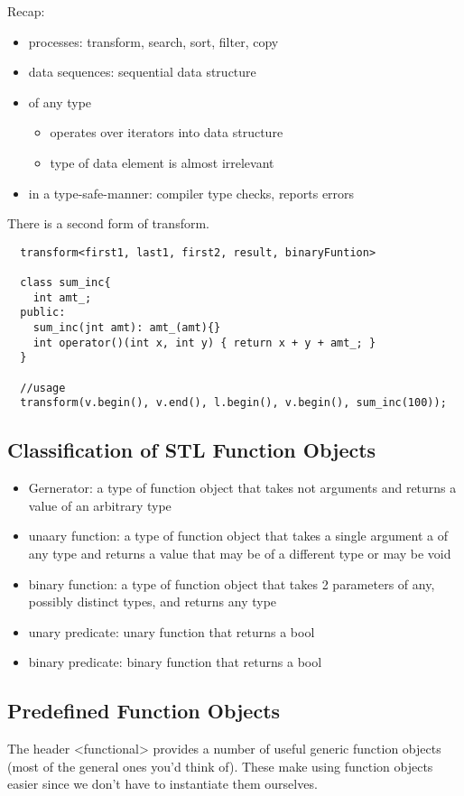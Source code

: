 \documentclass[12pt]{article}
\begin{document}
Recap:
\begin{itemize}
  \item processes: transform, search, sort, filter, copy
  \item data sequences: sequential data structure
  \item of any type
  \begin{itemize}
    \item operates over iterators into data structure
    \item type of data element is almost irrelevant
  \end{itemize}
  \item in a type-safe-manner: compiler type checks, reports errors
\end{itemize}

There is a second form of transform.
\begin{lstlisting}
  transform<first1, last1, first2, result, binaryFuntion>

  class sum_inc{
    int amt_;
  public:
    sum_inc(jnt amt): amt_(amt){}
    int operator()(int x, int y) { return x + y + amt_; }
  }

  //usage
  transform(v.begin(), v.end(), l.begin(), v.begin(), sum_inc(100));
\end{lstlisting}

\subsection*{Classification of STL Function Objects}
\begin{itemize}
  \item Gernerator: a type of function object that takes not arguments and returns a value of an arbitrary type
  \item unaary function: a type of function object that takes a single argument a of any type and returns a value that may be of a different type or may be void
  \item binary function: a type of function object that takes 2 parameters of any, possibly distinct types, and returns any type
  \item unary predicate: unary function that returns a bool
  \item binary predicate: binary function that returns a bool
\end{itemize}

\subsection*{Predefined Function Objects}
The header <functional> provides a number of useful generic function objects (most of the general ones you'd think of). These make using function objects easier since we don't have to instantiate them ourselves.
\end{document}
